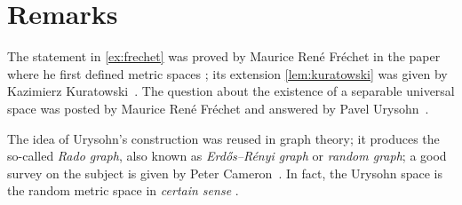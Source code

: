 \section{Remarks}

The statement in \ref{ex:frechet} was proved by Maurice René Fréchet in the paper where he first defined metric spaces \cite{frechet};
its extension \ref{lem:kuratowski} was given by Kazimierz Kuratowski~\cite{kuratowski}.
The question about the existence of a separable universal space was posted by Maurice René Fréchet and answered by
Pavel Urysohn~\cite{urysohn}.

The idea of Urysohn's construction was reused in graph theory; it produces the so-called {}\emph{Rado graph},
also known as {}\emph{Erd\H{o}s–R\'enyi graph} or \emph{random graph}; a good survey on the subject is given by Peter Cameron~\cite{cameron}.
In fact, the Urysohn space is the random metric space in \textit{certain sense} \cite{vershik}.



